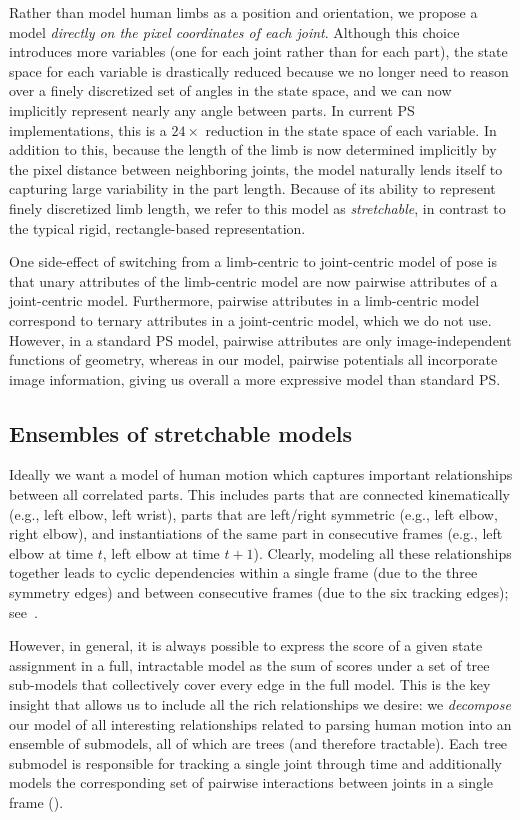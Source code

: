  Rather than model human limbs as a position 
and orientation, we propose a model {\em directly on the pixel coordinates of 
each joint}.  Although this choice introduces more variables 
(one for each joint rather than for each part), the state space for each 
variable is drastically reduced because we no longer need to reason over a 
finely discretized set of angles in the state space, and we can now implicitly 
represent nearly any angle between parts.  In current PS implementations, this is a 
$24\times$ reduction in the state space of each variable.  In addition to 
this, because the length of the limb is now determined implicitly by the pixel 
distance between neighboring joints, the model naturally lends itself to 
capturing large variability in the part length.  Because of its ability to 
represent finely discretized limb length, we refer to this model as
{\em stretchable}, in contrast to the typical rigid, rectangle-based 
representation.

One side-effect of switching from a limb-centric to joint-centric model of 
pose is that unary attributes of the limb-centric model are now pairwise 
attributes of a joint-centric model.  Furthermore, pairwise attributes in a 
limb-centric model correspond to ternary attributes in a joint-centric model, 
which we do not use.  However, in a standard PS model, pairwise attributes are 
only image-independent functions of geometry, whereas in our model, pairwise 
potentials all incorporate image information, giving us overall a more 
expressive model than standard PS. 



\subsection{Ensembles of stretchable models}
Ideally we want a model of human motion which captures important
relationships between all correlated parts.  This includes parts that
are connected kinematically (e.g., left elbow, left wrist), parts that
are left/right symmetric (e.g., left elbow, right elbow), and
instantiations of the same part in consecutive frames (e.g., left
elbow at time $t$, left elbow at time $t+1$).  Clearly, modeling all
these relationships together leads to cyclic dependencies
within a single frame (due to the three symmetry edges) and
between consecutive frames (due to the six tracking edges); 
see~. 

However, in general, it is always possible to express the score of a
given state assignment in a full, intractable model as the sum of
scores under a set of tree sub-models that collectively cover every
edge in the full model. This is the key insight that allows us to
include all the rich relationships we desire: we {\em decompose} our
model of all interesting relationships related to parsing human motion
into an ensemble of submodels, all of which are trees (and therefore
tractable). Each tree submodel is responsible for tracking a single
joint through time and additionally models the corresponding set of
pairwise interactions between joints in a single frame
().

